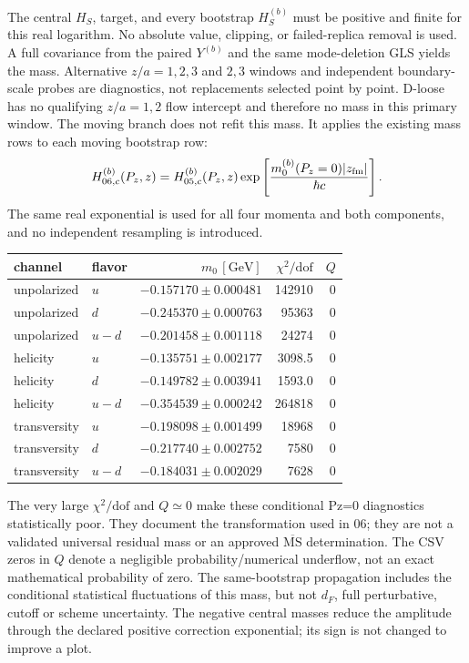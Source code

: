 \documentclass[11pt]{article}
\numberwithin{equation}{section}
\begin{document}
The central \(H_S\), target, and every bootstrap \(H_S^{(b)}\) must
be positive and finite for this real logarithm.  No absolute value,
clipping, or failed-replica removal is used.  A full covariance from
the paired \(Y^{(b)}\) and the same mode-deletion GLS yields the mass.
Alternative \(z/a=1,2,3\) and \(2,3\) windows and independent boundary-scale
probes are diagnostics, not replacements selected point by point.
D-loose has no qualifying \(z/a=1,2\) flow intercept and therefore no
mass in this primary window.
The moving branch does not refit this mass.  It applies the existing mass
rows to each moving bootstrap row:
\begin{equation}
 H_{06,c}^{(b)}(P_z,z)=H_{05,c}^{(b)}(P_z,z)
 \exp\left[
 \frac{m_0^{(b)}(P_z=0)|z_{\rm fm}|}{\hbar c}\right].
\label{eq:l32x64-m0-paired}
\end{equation}
The same real exponential is used for all four momenta and both components,
and no independent resampling is introduced.

\begin{center}
\small
\begin{tabular}{@{}llrrr@{}}
\toprule
channel & flavor & \(m_0\,[\mathrm{GeV}]\) & \(\chi^2/\mathrm{dof}\) & \(Q\)\\
\midrule
unpolarized & \(u\) & \(-0.157170\pm0.000481\) & 142910 & 0\\
unpolarized & \(d\) & \(-0.245370\pm0.000763\) & 95363 & 0\\
unpolarized & \(u-d\) & \(-0.201458\pm0.001118\) & 24274 & 0\\
helicity & \(u\) & \(-0.135751\pm0.002177\) & 3098.5 & 0\\
helicity & \(d\) & \(-0.149782\pm0.003941\) & 1593.0 & 0\\
helicity & \(u-d\) & \(-0.354539\pm0.000242\) & 264818 & 0\\
transversity & \(u\) & \(-0.198098\pm0.001499\) & 18968 & 0\\
transversity & \(d\) & \(-0.217740\pm0.002752\) & 7580 & 0\\
transversity & \(u-d\) & \(-0.184031\pm0.002029\) & 7628 & 0\\
\bottomrule
\end{tabular}
\end{center}
The very large \(\chi^2/\mathrm{dof}\) and \(Q\simeq0\) make these
conditional Pz=0 diagnostics statistically poor.  They document the
transformation used in 06; they are not a validated universal residual
mass or an approved \(\overline{\mathrm{MS}}\) determination.
The CSV zeros in \(Q\) denote a negligible probability/numerical underflow,
not an exact mathematical probability of zero.  The same-bootstrap
propagation includes the conditional statistical fluctuations of this mass,
but not \(d_F\), full perturbative, cutoff or scheme uncertainty.
The negative central masses reduce the amplitude through the declared
positive correction exponential; its sign is not changed to improve a plot.
\end{document}
